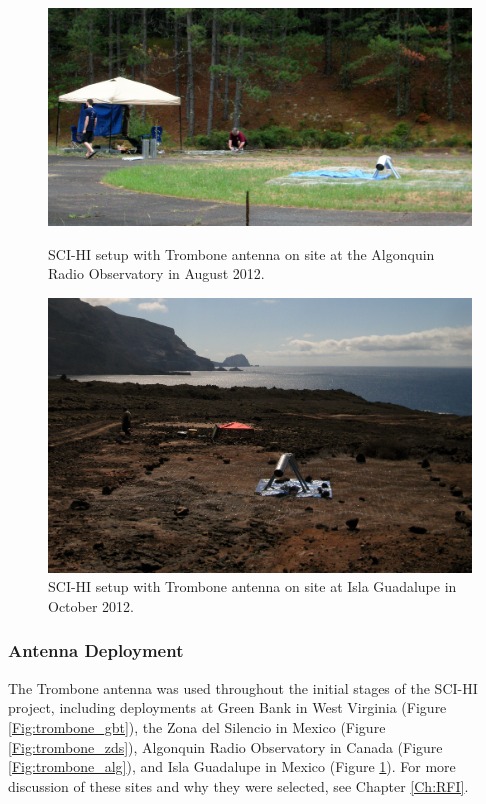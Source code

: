 \begin{figure}[htb]
\centering
\begin{minipage}[b]{0.52\textwidth}
\centering
\includegraphics[width=0.95\linewidth]{SCIHI_system/figures/trombone_alg_sys.jpg}
\caption{SCI-HI setup with Trombone antenna on site at the Algonquin Radio Observatory in August 2012.}
\label{Fig:trombone_alg}
\end{minipage}%
\begin{minipage}[b]{0.02\textwidth}
\hspace{1cm}
\end{minipage}%
\begin{minipage}[b]{0.42\textwidth}
\centering
\includegraphics[width=0.95\linewidth]{SCIHI_system/figures/trombone_sys_guad.jpg}
\caption{SCI-HI setup with Trombone antenna on site at Isla Guadalupe in October 2012.}
\label{Fig:trombone_guad}
\end{minipage}
\end{figure}

\subsubsection{Antenna Deployment}
The Trombone antenna was used throughout the initial stages of the SCI-HI project, including deployments at Green Bank in West Virginia (Figure \ref{Fig:trombone_gbt}), the Zona del Silencio in Mexico (Figure \ref{Fig:trombone_zds}), Algonquin Radio Observatory in Canada (Figure \ref{Fig:trombone_alg}), and Isla Guadalupe in Mexico (Figure \ref{Fig:trombone_guad}). For more discussion of these sites and why they were selected, see Chapter \ref{Ch:RFI}.

